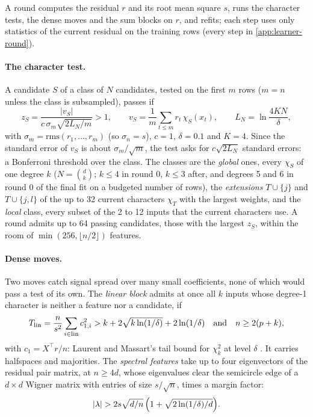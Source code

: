 A round computes the residual $r$ and its root mean square $s$, runs the character tests, the dense moves and the sum blocks on $r$, and refits; each step uses only statistics of the current residual on the training rows (every step in \cref{app:learner-round}).

\paragraph{The character test.} A candidate $S$ of a class of $N$ candidates, tested on the first $m$ rows ($m=n$ unless the class is subsampled), passes if
\begin{equation}\label{eq:chartest}
z_S=\frac{|v_S|}{c\,\sigma_m\sqrt{2L_N/m}}>1,\qquad v_S=\frac1m\sum_{t\le m}r_t\,\chi_S(x_t),\qquad L_N=\ln\frac{4KN}{\delta},
\end{equation}
with $\sigma_m=\mathrm{rms}(r_1,\dots,r_m)$ (so $\sigma_n=s$), $c=1$, $\delta=0.1$ and $K=4$. Since the standard error of $v_S$ is about $\sigma_m/\sqrt m$, the test asks for $c\sqrt{2L_N}$ standard errors: a Bonferroni threshold over the class. The classes are the \emph{global} ones, every $\chi_S$ of one degree $k$ ($N=\binom dk$; $k\le4$ in round 0, $k\le3$ after, and degrees 5 and 6 in round 0 of the final fit on a budgeted number of rows), the \emph{extensions} $T\cup\{j\}$ and $T\cup\{j,l\}$ of the up to 32 current characters $\chi_T$ with the largest weights, and the \emph{local} class, every subset of the 2 to 12 inputs that the current characters use. A round admits up to 64 passing candidates, those with the largest $z_S$, within the room of $\min(256,\lfloor n/2\rfloor)$ features.

\paragraph{Dense moves.} Two moves catch signal spread over many small coefficients, none of which would pass a test of its own. The \emph{linear block} admits at once all $k$ inputs whose degree-1 character is neither a feature nor a candidate, if
\begin{equation}\label{eq:lintest}
T_{\rm lin}=\frac n{s^2}\sum_{i\in\mathrm{lin}}c_{1,i}^2>k+2\sqrt{k\ln(1/\delta)}+2\ln(1/\delta)\quad\text{and}\quad n\ge2(p+k),
\end{equation}
with $c_1=X^\top r/n$: Laurent and Massart's tail bound for $\chi^2_k$ at level $\delta$ \cite{laurent2000adaptive}. It carries halfspaces and majorities. The \emph{spectral features} take up to four eigenvectors of the residual pair matrix, at $n\ge4d$, whose eigenvalues clear the semicircle edge of a $d\times d$ Wigner matrix with entries of size $s/\sqrt n$, times a margin factor:
\begin{equation}\label{eq:spectest}
|\lambda|>2s\sqrt{d/n}\,\Bigl(1+\sqrt{2\ln(1/\delta)/d}\Bigr).
\end{equation}

